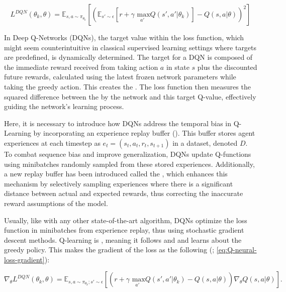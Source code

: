 \begin{equation}
    L^{DQN}(\theta_k, \theta) = \mathbb{E}_{s, a \sim \pi_{\theta_k}} \left [ \left (  \mathbb{E}_{s' \sim \epsilon} \left [ r + \gamma \underset{a'}{\text{ max}} Q(s', a' | \theta_k ) \right] - Q(s, a | \theta)  \right )^2\right]
    \label{eq:Q-neural-loss}
\end{equation}


\noindent In Deep Q-Networks (DQNs), the target value within the loss function, which might seem counterintuitive in classical supervised learning settings where targets are predefined, is dynamically determined. The target for a DQN is composed of the immediate reward received from taking action $a$ in state $s$ plus the discounted future rewards, calculated using the latest frozen network parameters while taking the greedy action. This creates the . The loss function then measures the squared difference between the  by the network and this target Q-value, effectively guiding the network's learning process.

\bigskip

\noindent Here, it is necessary to introduce how DQNs address the temporal bias in Q-Learning by incorporating an experience replay buffer (\textcolor{deepblue}{\cite{fedus2020revisiting}}). This buffer stores agent experiences at each timestep as $e_t = (s_t, a_t, r_t, s_{t+1})$ in a dataset, denoted $D$. To combat sequence bias and improve generalization, DQNs update Q-functions using minibatches randomly sampled from these stored experiences. Additionally, a new replay buffer has been introduced called the , which enhances this mechanism by selectively sampling experiences where there is a significant distance between actual and expected rewards, thus correcting the inaccurate reward assumptions of the model.

\bigskip

\noindent Usually, like with any other state-of-the-art algorithm, DQNs optimize the loss function in minibatches from experience replay, thus using stochastic gradient descent methods. Q-learning is , meaning it follows and  and learns about the greedy policy. This makes the gradient of the loss as the following (\textcolor{deepblue}{\cite{mnih2013playing}; \autoref{eq:Q-neural-loss-gradient}}):

\begin{equation}
    \nabla_{\theta} L^{DQN}(\theta_k, \theta) = \mathbb{E}_{s, a \sim \pi_{\theta_k}; s' \sim \epsilon} \left [ \left ( r + \gamma\underset{a'}{\text{ max}}Q(s', a' | \theta_k) - Q(s, a | \theta) \right ) \nabla_\theta Q(s, a | \theta) \right].
    \label{eq:Q-neural-loss-gradient}
\end{equation}

